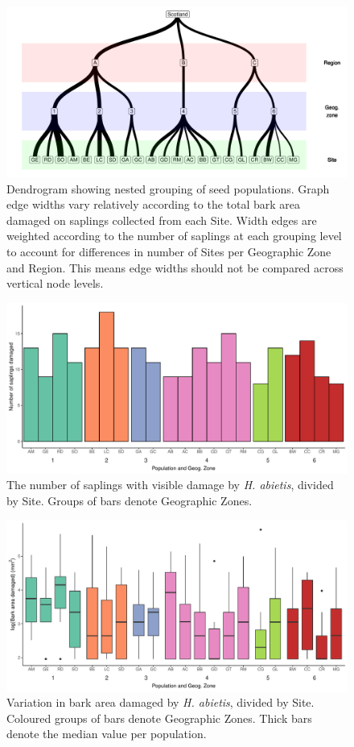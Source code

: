 \documentclass[a4paper, 11pt]{article}
\begin{document}
\begin{figure}[H]
	\includegraphics[width=\textwidth]{dendro}
	\caption{Dendrogram showing nested grouping of seed populations. Graph edge widths vary relatively according to the total bark area damaged on saplings collected from each Site. Width edges are weighted according to the number of saplings at each grouping level to account for differences in number of Sites per Geographic Zone and Region. This means edge widths should not be compared across vertical node levels.}
	\label{dendro}
\end{figure}

\begin{figure}[H]
	\includegraphics[width=\textwidth]{barchart}
	\caption{The number of saplings with visible damage by \textit{H. abietis}, divided by Site. Groups of bars denote Geographic Zones.}
	\label{barchart}
\end{figure}

\begin{figure}[H]
	\includegraphics[width=\textwidth]{boxplot}
	\caption{Variation in bark area damaged by \textit{H. abietis}, divided by Site. Coloured groups of bars denote Geographic Zones. Thick bars denote the median value per population.}
	\label{boxplot}
\end{figure}
\end{document}
